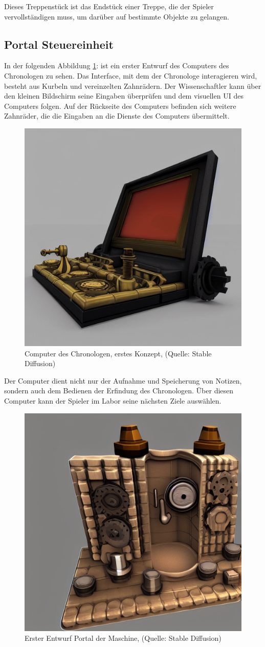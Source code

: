 Dieses Treppenstück ist das Endstück einer Treppe, die der Spieler vervollständigen muss, um darüber auf bestimmte Objekte zu gelangen.

\subsection{Portal Steuereinheit}\label{sec:portal}
In der folgenden Abbildung \ref{fig:bsp_computer_03}:  ist ein erster Entwurf des Computers des Chronologen zu sehen. Das Interface, mit dem der Chronologe interagieren wird, besteht aus Kurbeln und vereinzelten Zahnrädern. Der Wissenschaftler kann über den kleinen Bildschirm seine Eingaben überprüfen und dem visuellen \ac{UI} des Computers folgen. Auf der Rückseite des Computers befinden sich weitere Zahnräder, die die Eingaben an die Dienste des Computers übermittelt. 

\begin{figure}[ht]
\centering
\includegraphics[width=0.6\linewidth]{content/pictures/bsp_computer_03.jpg}
\caption{Computer des Chronologen, erstes Konzept, (Quelle: Stable Diffusion)}
\label{fig:bsp_computer_03}
\end{figure}

Der Computer dient nicht nur der Aufnahme und Speicherung von Notizen, sondern auch dem Bedienen der Erfindung des Chronologen. Über diesen Computer kann der Spieler im Labor seine nächsten Ziele auswählen.

\begin{figure}[ht]
\centering
\includegraphics[width=0.6\linewidth]{content/pictures/portal_01.jpg}
\caption{Erster Entwurf Portal der Maschine, (Quelle: Stable Diffusion)}
\label{fig:portal_01}
\end{figure}

